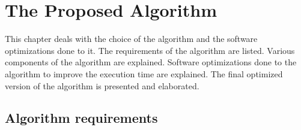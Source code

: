\chapter{The Proposed Algorithm}
\label{chap:algorithm}

This chapter deals with the choice of the algorithm and the software optimizations done to it. The requirements of the algorithm are listed. Various components of the algorithm are explained. Software optimizations done to the algorithm to improve the execution time are explained. The final optimized version of the algorithm is presented and elaborated.


\section{Algorithm requirements}
\label{s:requirements}

